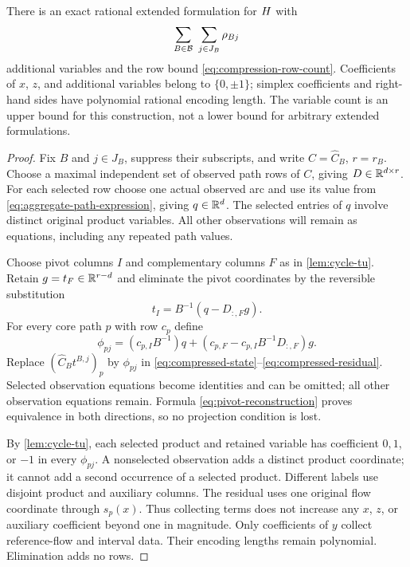 \begin{theorem}\label{thm:observed-compression}
There is an exact rational extended formulation for $H$ with
\begin{equation}\label{eq:observed-variable-count}
 \sum_{B\in\mathcal B}\ \sum_{j\in J_B}\rho_{Bj}
\end{equation}
additional variables and the row bound \eqref{eq:compression-row-count}.
Coefficients of $x$, $z$, and additional variables belong to $\{0,\pm1\}$;
simplex coefficients and right-hand sides have polynomial rational encoding
length. The variable count is an upper bound for this construction, not a
lower bound for arbitrary extended formulations.
\end{theorem}
\begin{proof}
Fix $B$ and $j\in J_B$, suppress their subscripts, and write
$C=\widehat C_B$, $r=r_B$. Choose a maximal independent set of observed
path rows of $C$, giving $D\in\mathbb R^{d\times r}$. For each selected row
choose one actual observed arc and use its value from
\eqref{eq:aggregate-path-expression}, giving $q\in\mathbb R^d$. The selected
entries of $q$ involve distinct original product variables. All other
observations will remain as equations, including any repeated path values.

Choose pivot columns $I$ and complementary columns $F$ as in
\cref{lem:cycle-tu}. Retain $g=t_F\in\mathbb R^{r-d}$ and eliminate the pivot
coordinates by the reversible substitution
\begin{equation}\label{eq:pivot-reconstruction}
 t_I=B^{-1}(q-D_{:,F}g).
\end{equation}
For every core path $p$ with row $c_p$ define
\begin{equation}\label{eq:path-reconstruction}
 \phi_{pj}=(c_{p,I}B^{-1})q+
            (c_{p,F}-c_{p,I}B^{-1}D_{:,F})g.
\end{equation}
Replace $(\widehat C_Bt^{B,j})_p$ by $\phi_{pj}$ in
\eqref{eq:compressed-state}--\eqref{eq:compressed-residual}. Selected
observation equations become identities and can be omitted; all other
observation equations remain. Formula \eqref{eq:pivot-reconstruction}
proves equivalence in both directions, so no projection condition is lost.

By \cref{lem:cycle-tu}, each selected product and retained variable has
coefficient $0,1$, or $-1$ in every $\phi_{pj}$. A nonselected observation
adds a distinct product coordinate; it cannot add a second occurrence of
a selected product. Different labels use disjoint product and auxiliary
columns. The residual uses one original flow coordinate through $s_p(x)$.
Thus collecting terms does not increase any $x$, $z$, or auxiliary
coefficient beyond one in magnitude. Only coefficients of $y$ collect
reference-flow and interval data. Their encoding lengths remain polynomial.
Elimination adds no rows.


\end{proof}
